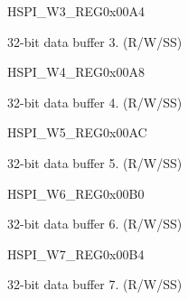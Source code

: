 \begin{register}{H}{SPI\_W3\_REG}{0x00A4}\label{regdesc:SPIW3REG}
%
\regnewline%
\begin{regdesc}\begin{reglist}
\label{fielddesc:SPIBUF3}\item [SPI\_BUF3] 32-bit data buffer 3. (R/W/SS)
\end{reglist}\end{regdesc}
\end{register}


\begin{register}{H}{SPI\_W4\_REG}{0x00A8}\label{regdesc:SPIW4REG}
%
\regnewline%
\begin{regdesc}\begin{reglist}
\label{fielddesc:SPIBUF4}\item [SPI\_BUF4] 32-bit data buffer 4. (R/W/SS)
\end{reglist}\end{regdesc}
\end{register}


\begin{register}{H}{SPI\_W5\_REG}{0x00AC}\label{regdesc:SPIW5REG}
%
\regnewline%
\begin{regdesc}\begin{reglist}
\label{fielddesc:SPIBUF5}\item [SPI\_BUF5] 32-bit data buffer 5. (R/W/SS)
\end{reglist}\end{regdesc}
\end{register}


\begin{register}{H}{SPI\_W6\_REG}{0x00B0}\label{regdesc:SPIW6REG}
%
\regnewline%
\begin{regdesc}\begin{reglist}
\label{fielddesc:SPIBUF6}\item [SPI\_BUF6] 32-bit data buffer 6. (R/W/SS)
\end{reglist}\end{regdesc}
\end{register}


\begin{register}{H}{SPI\_W7\_REG}{0x00B4}\label{regdesc:SPIW7REG}
%
\regnewline%
\begin{regdesc}\begin{reglist}
\label{fielddesc:SPIBUF7}\item [SPI\_BUF7] 32-bit data buffer 7. (R/W/SS)
\end{reglist}\end{regdesc}
\end{register}


